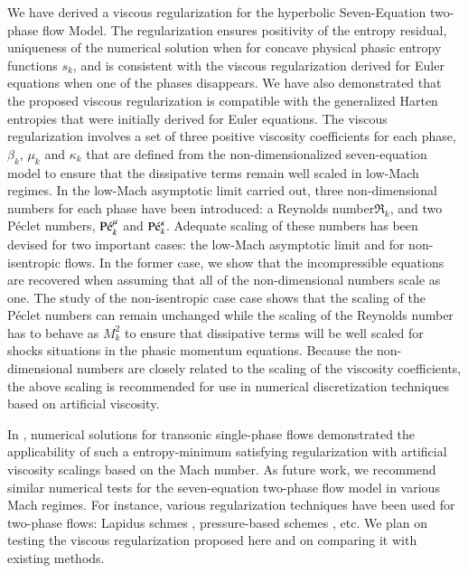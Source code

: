 \documentclass[preprint,10pt]{elsarticle}
\begin{document}
We have derived a viscous regularization for the hyperbolic Seven-Equation two-phase flow Model. The regularization ensures positivity of the entropy residual, uniqueness of the numerical solution when for concave physical phasic entropy functions $s_k$, and is consistent with the viscous regularization derived for Euler equations when one of the phases disappears. 
We have also demonstrated that the proposed viscous regularization is compatible with the generalized Harten entropies that were initially derived for Euler equations. The viscous regularization involves a set of three positive viscosity coefficients for each phase, $\beta_k$, $\mu_k$ and $\kappa_k$ that are defined from the non-dimensionalized seven-equation model to ensure that the dissipative terms remain well scaled in
low-Mach regimes. In the low-Mach asymptotic limit carried out, three non-dimensional numbers for each phase have been introduced: a Reynolds number$\Re_k$, and two P\'eclet numbers, $\textrm{P\'e}_k^\mu$ and $\textrm{P\'e}_k^\kappa$. Adequate scaling of these numbers has been devised for two important cases: the low-Mach asymptotic limit and for non-isentropic flows. In the former case, we show that the incompressible equations are recovered when assuming that all of the non-dimensional numbers scale as one. The study of the non-isentropic case case shows that the scaling of the P\'eclet numbers can remain unchanged while the scaling of the Reynolds number has to behave as $M_k^2$ to ensure that dissipative terms will be well scaled for shocks situations in the phasic momentum equations. Because the non-dimensional numbers are closely related to the scaling of the viscosity coefficients, the above scaling is recommended for use in numerical discretization techniques based on artificial viscosity. 

In \cite{Marco_paper_low_mach}, numerical solutions for transonic single-phase flows demonstrated the applicability of such a entropy-minimum satisfying regularization with artificial viscosity scalings based on the Mach number. As future work, we recommend similar numerical tests for the seven-equation two-phase flow model in various Mach regimes. For instance, various regularization techniques have been used for two-phase flows: Lapidus schmes \cite{Lapidus_paper, Lapidus_book}, pressure-based schemes \cite{PBV_book}, etc.  We plan on testing the viscous regularization proposed here and on comparing it with existing methods. 




\clearpage

\end{document}
